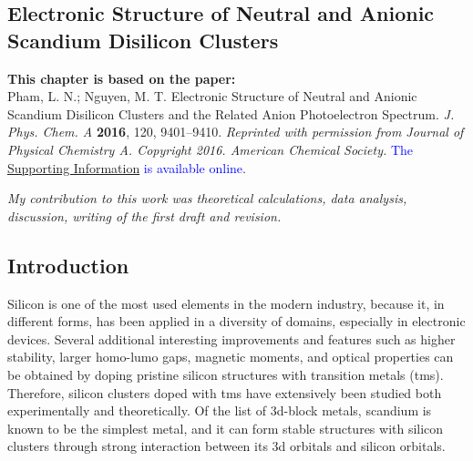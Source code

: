 

\begin{refsection}

\chapter[Scandium Disilicon]{Electronic Structure of Neutral and Anionic Scandium Disilicon  Clusters} \label{ScSi2}


\begin{shaded}
\textbf{This chapter is based on the paper:}\\
Pham, L. N.; Nguyen, M. T. Electronic Structure of Neutral and Anionic Scandium Disilicon  Clusters and the Related Anion Photoelectron Spectrum. \textit{J. Phys. Chem. A} \textbf{2016}, 120, 9401–9410. \textit{Reprinted with permission from Journal of Physical Chemistry A. Copyright 2016. American Chemical Society.} \textcolor{blue}{The \href{https://pubs.acs.org/doi/suppl/10.1021/acs.jpca.6b09067/suppl_file/jp6b09067_si_001.pdf}{Supporting Information} is available online}.

\emph{My contribution to this work was theoretical calculations, data analysis, discussion, writing of the first draft and revision.}
\newpage
\end{shaded}



\section{Introduction}

Silicon is one of the most used elements in the modern industry, because it, in different forms, has been applied in a diversity of domains, especially in electronic devices. Several additional interesting improvements and features such as higher stability,\cite{c3:1, c3:2, c3:3, c3:4, c3:5} larger \acrshort{homo}-\acrshort{lumo} gaps,\cite{c3:6} magnetic moments,\cite{c3:7} and optical properties \cite{c3:8} can be obtained by doping pristine silicon structures with transition metals (\acrshort{tm}s). Therefore, silicon clusters doped with \acrshort{tm}s have extensively been studied both experimentally and theoretically. Of the list of 3d-block metals, scandium is known to be the simplest metal, and it can form stable structures with silicon clusters through strong interaction between its 3d orbitals and silicon orbitals.\cite{c3:9, c3:10} 





\end{refsection}
